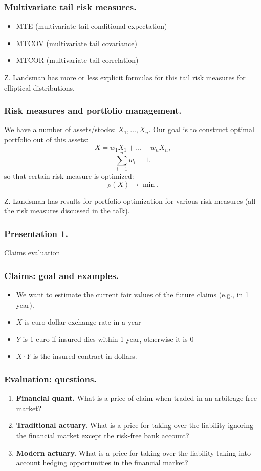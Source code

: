 \documentclass{beamer}
\begin{document}
\begin{frame}[fragile]
\frametitle{Multivariate tail risk measures.}
\begin{itemize}
	\item MTE (multivariate tail conditional expectation)
	\item MTCOV (multivariate tail covariance)
	\item MTCOR (multivariate tail correlation)
\end{itemize}
Z. Landsman has more or less explicit formulas for this tail risk measures for elliptical distributions. 
\end{frame}
\begin{frame}[fragile]
\frametitle{Risk measures and portfolio management.}
We have a number of assets/stocks: $X_1, \ldots, X_n$. Our goal is to construct optimal portfolio out of this assets:
$$X = w_1X_1 + \ldots + w_nX_n,$$
$$\sum_{i=1}^n w_i = 1.$$
so that certain risk measure is optimized:
$$\rho(X) \longrightarrow \min.$$

Z. Landsman has results for portfolio optimization for various risk measures (all the risk measures discussed in the talk).
\end{frame}
\begin{frame}[fragile]
\frametitle{Presentation 1.}
\begin{center}
\Large{Claims evaluation}
\end{center}
\end{frame}
\begin{frame}[fragile]
\frametitle{Claims: goal and examples.}
\begin{itemize}
  \item We want to estimate the current fair values of the future claims (e.g., in 1 year).
	\item $X$ is euro-dollar exchange rate in a year
	\item $Y$ is 1 euro if insured dies within 1 year, otherwise it is 0
	\item $X\cdot Y$ is the insured contract in dollars.
\end{itemize}
\end{frame}
\begin{frame}[fragile]
\frametitle{Evaluation: questions.}
\begin{enumerate}
\item \textbf{Financial quant.} What is a price of claim when traded in an arbitrage-free market?
\item \textbf{Traditional actuary.} What is a price for taking over the liability ignoring the financial market except the risk-free bank account?
\item \textbf{Modern actuary.} What is a price for taking over the liability taking into account hedging opportunities in the financial market?
\end{enumerate}
\end{frame}
\end{document}

